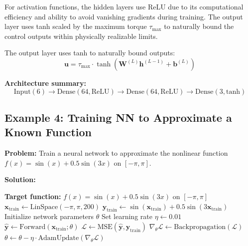 For activation functions, the hidden layers use ReLU due to its computational efficiency and ability to avoid vanishing gradients during training. The output layer uses tanh scaled by the maximum torque $\tau_{\max}$ to naturally bound the control outputs within physically realizable limits.

The output layer uses tanh to naturally bound outputs:
\begin{equation}
\mathbf{u} = \tau_{\max} \cdot \tanh(\mathbf{W}^{(L)}\mathbf{h}^{(L-1)} + \mathbf{b}^{(L)})
\end{equation}

\textbf{Architecture summary:}
\begin{equation}
\boxed{\text{Input}(6) \to \text{Dense}(64, \text{ReLU}) \to \text{Dense}(64, \text{ReLU}) \to \text{Dense}(3, \text{tanh})}
\end{equation}

\hrulefill

\subsection{Example 4: Training NN to Approximate a Known Function}

\textbf{Problem:} Train a neural network to approximate the nonlinear function $f(x) = \sin(x) + 0.5\sin(3x)$ on $[-\pi, \pi]$.

\textbf{Solution:}

\begin{algorithm}[htbp]
\caption{Training Neural Network to Approximate Nonlinear Function}
\label{alg:function_approximation}
\begin{algorithmic}[1]
\State \textbf{Target function:} $f(x) = \sin(x) + 0.5\sin(3x)$ on $[-\pi, \pi]$
\State
\State {}
\State $\mathbf{x}_{\text{train}} \gets \text{LinSpace}(-\pi, \pi, 200)$
\State $\mathbf{y}_{\text{train}} \gets \sin(\mathbf{x}_{\text{train}}) + 0.5 \sin(3 \mathbf{x}_{\text{train}})$
\State
\State {}
\State Initialize network parameters $\theta$
\State Set learning rate $\eta \gets 0.01$
\State
{}
    \State $\hat{\mathbf{y}} \gets \text{Forward}(\mathbf{x}_{\text{train}}; \theta)$
    \State $\mathcal{L} \gets \text{MSE}(\hat{\mathbf{y}}, \mathbf{y}_{\text{train}})$
    \State $\nabla_\theta \mathcal{L} \gets \text{Backpropagation}(\mathcal{L})$
    \State $\theta \gets \theta - \eta \cdot \text{AdamUpdate}(\nabla_\theta \mathcal{L})$
\EndFor
\State
\State {}
\end{algorithmic}
\end{algorithm}

